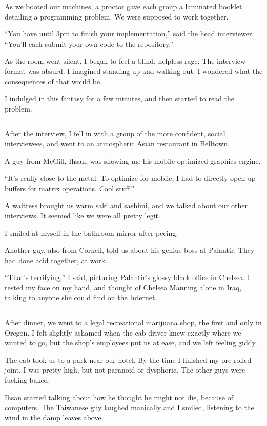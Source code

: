 As we booted our machines, a proctor gave each group a laminated booklet
detailing a programming problem.  We were supposed to work together.

``You have until 3pm to finish your implementation,'' said the head interviewer.
``You'll each submit your own code to the repository.''

As the room went silent, I began to feel a blind, helpless rage.  The interview
format was absurd.  I imagined standing up and walking out.  I wondered what the
consequences of that would be.  

I indulged in this fantasy for a few minutes, and then started to read the
problem.

\plainfancybreak{12pt}{2}{}

After the interview, I fell in with a group of the more confident, social
interviewees, and went to an atmospheric Asian restaurant in Belltown.

A guy from McGill, Ihsan, was showing me his mobile-optimized graphics engine.

``It's really close to the metal.  To optimize for mobile, I had to directly
open up buffers for matrix operations.  Cool stuff.''

A waitress brought us warm saki and sashimi, and we talked about our other
interviews.  It seemed like we were all pretty legit.

I smiled at myself in the bathroom mirror after peeing.  

Another guy, also from Cornell, told us about his genius boss at Palantir.  They
had done acid together, at work.

``That's terrifying,'' I said, picturing Palantir's glossy black office in
Chelsea.  I rested my face on my hand, and thought of Chelsea Manning alone in
Iraq, talking to anyone she could find on the Internet.

\plainfancybreak{12pt}{2}{}

After dinner, we went to a legal recreational marijuana shop, the first and only
in Oregon.  I felt slightly ashamed when the cab driver knew exactly where we
wanted to go, but the shop's employees put us at ease, and we left feeling
giddy.  

The cab took us to a park near our hotel.  By the time I finished my pre-rolled
joint, I was pretty high, but not paranoid or dysphoric.   The other guys were
fucking baked.  

Ihsan started talking about how he thought he might not die, because of
computers.  The Taiwanese guy laughed manically and I smiled, listening to the
wind in the damp leaves above.


